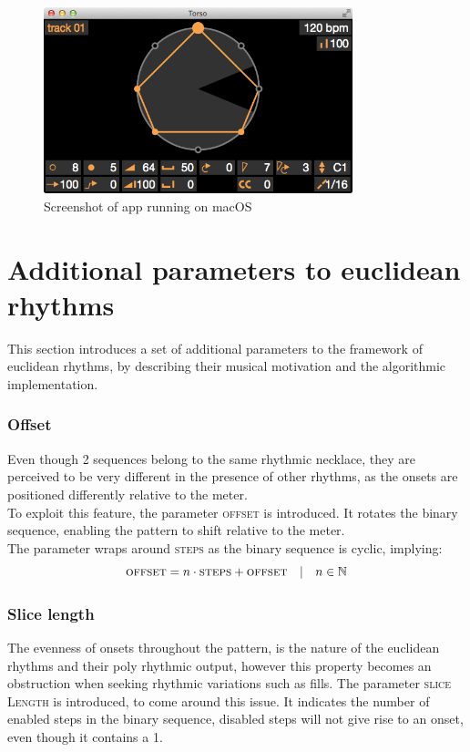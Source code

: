 \begin{figure}[H]
    \centering
    \includegraphics[width=0.8\textwidth]{graphics/app_screenshot.png}
    \caption{Screenshot of app running on macOS}
    \label{fig:app}
\end{figure}



\section{Additional parameters to euclidean rhythms}
This section introduces a set of additional parameters to the framework of euclidean rhythms, by describing their musical motivation and the algorithmic implementation.

\subsubsection{Offset}
Even though 2 sequences belong to the same rhythmic necklace, they are perceived to be very different in the presence of other rhythms, as the onsets are positioned differently relative to the meter.\\
To exploit this feature, the parameter \textsc{offset} is introduced. It rotates the binary sequence, enabling the pattern to shift relative to the meter. \\
The parameter wraps around \textsc{steps} as the binary sequence is cyclic, implying:
\begin{equation*}
    \textsc{offset}=n\cdot \textsc{steps} + \textsc{offset} \quad |  \quad n \in \mathbb{N}
\end{equation*}
    
\subsubsection{Slice length}
The evenness of onsets throughout the pattern, is the nature of the euclidean rhythms and their poly rhythmic output, however this property becomes an obstruction when seeking rhythmic variations such as fills. The parameter \textsc{slice Length} is introduced, to come around this issue. It indicates the number of enabled steps in the binary sequence, disabled steps will not give rise to an onset, even though it contains a 1. 

